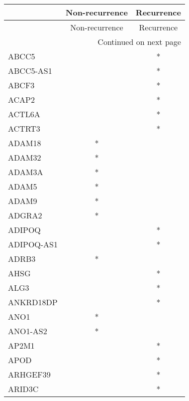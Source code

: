 \begin{longtable}{lcc}
\toprule
{} & Non-recurrence & Recurrence \\
\midrule
\endfirsthead

\toprule
{} & Non-recurrence & Recurrence \\
\midrule
\endhead
\midrule
\multicolumn{3}{r}{{Continued on next page}} \\
\midrule
\endfoot

\bottomrule
\endlastfoot
ABCC5            &                &          * \\
ABCC5-AS1        &                &          * \\
ABCF3            &                &          * \\
ACAP2            &                &          * \\
ACTL6A           &                &          * \\
ACTRT3           &                &          * \\
ADAM18           &              * &            \\
ADAM32           &              * &            \\
ADAM3A           &              * &            \\
ADAM5            &              * &            \\
ADAM9            &              * &            \\
ADGRA2           &              * &            \\
ADIPOQ           &                &          * \\
ADIPOQ-AS1       &                &          * \\
ADRB3            &              * &            \\
AHSG             &                &          * \\
ALG3             &                &          * \\
ANKRD18DP        &                &          * \\
ANO1             &              * &            \\
ANO1-AS2         &              * &            \\
AP2M1            &                &          * \\
APOD             &                &          * \\
ARHGEF39         &                &          * \\
ARID3C           &                &          * \\

\end{longtable}
